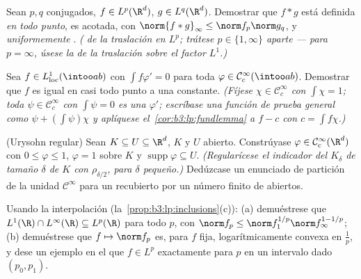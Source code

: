 \begin{exercise}[$\star\star$]\label{exo:b3:lp:6}
Sean $p, q$ conjugados, $f \in L^p(\R^d)$, $g \in
L^q(\R^d)$. Demostrar que $f * g$ está definida \emph{en todo punto}, es
acotada, con $\norm{f*g}_\infty \leq \norm f_p\norm g_q$, y
\emph{uniformemente }.
\emph{( de la traslación
en $L^p$; trátese $p \in \{1, \infty\}$ aparte --- para $p =
\infty$, úsese la  de la
traslación sobre el factor $L^1$.)}
\end{exercise}

\begin{exercise}[$\star\star$]\label{exo:b3:lp:7}
Sea $f \in L^1_{\mathrm{loc}}(\intoo ab)$ con $\int f\varphi' = 0$ para
toda $\varphi \in \mathcal
C^\infty_c(\intoo ab)$. Demostrar que $f$ es igual en casi todo punto a
una constante. \emph{(Fíjese $\chi \in \mathcal C_c^\infty$ con
$\int\chi = 1$; toda $\psi \in \mathcal C_c^\infty$ con $\int\psi = 0$
es una $\varphi'$; escríbase una función de prueba general como
$\psi + (\int\psi)\chi$ y aplíquese el~\cref{cor:b3:lp:fundlemma} a
$f - c$ con $c = \int
f\chi$.)}
\end{exercise}

\begin{exercise}[$\star\star\star$]\label{exo:b3:lp:8}
(Urysohn regular) Sean $K \subseteq U \subseteq \R^d$, $K$
 y $U$ abierto. Constrúyase
$\varphi \in \mathcal
C^\infty_c(\R^d)$ con $0 \leq \varphi \leq 1$, $\varphi = 1$ sobre $K$ y
$\operatorname{supp}\varphi \subseteq U$. \emph{(Regularícese el
indicador del  $K_\delta$ de tamaño $\delta$ de $K$ con
$\rho_{\delta/2}$, para $\delta$ pequeño.)} Dedúzcase un enunciado de
partición de la unidad $\mathcal C^\infty$ para un
 recubierto por un número
finito de abiertos.
\end{exercise}

\begin{exercise}[$\star\star$]\label{exo:b3:lp:9}
Usando la interpolación (la~\cref{prop:b3:lp:inclusions}(c)): (a)
demuéstrese que $L^1(\R)\cap L^\infty(\R) \subseteq L^p(\R)$ para todo
$p$, con $\norm f_p \leq \norm f_1^{1/p}\norm
f_\infty^{1 - 1/p}$; (b) demuéstrese que $f \mapsto \norm f_p$ es, para
$f$ fija, logarítmicamente convexa en $\frac1p$, y dese un ejemplo en el
que $f \in L^p$ exactamente para $p$ en un intervalo dado $(p_0, p_1)$.
\end{exercise}

